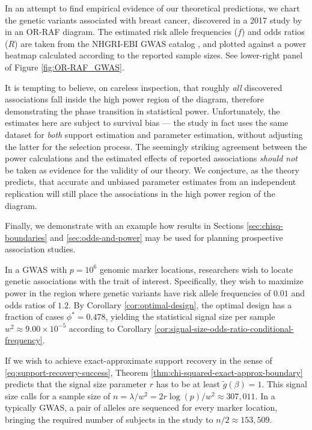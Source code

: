 \begin{remark}
\label{rmk:OR-RAF_false_evidence}
In an attempt to find empirical evidence of our theoretical predictions, we chart the genetic variants associated with breast cancer, discovered in a 2017 study by \citet{michailidou2017association} in an OR-RAF diagram. 
The estimated risk allele frequencies ($f$) and odds ratios ($R$) are taken from the NHGRI-EBI GWAS catalog \cite{macarthur2016new}, and plotted against a power heatmap calculated according to the reported sample sizes. 
See lower-right panel of Figure \ref{fig:OR-RAF_GWAS}.

It is tempting to believe, on careless inspection, that roughly \emph{all} discovered associations fall inside the high power region of the diagram, therefore demonstrating the phase transition in statistical power.
Unfortunately, the estimates here are subject to survival {bias} --- the study in fact uses the {same} dataset for \emph{both} support estimation and parameter estimation, without adjusting the latter for the selection process.
The seemingly striking agreement between the power calculations and the estimated effects of reported associations \emph{should not} be taken as evidence for the validity of our theory.
We conjecture, as the theory predicts, that accurate and unbiased parameter estimates from an independent replication will still place the associations in the high power region of the diagram. 
\end{remark}

Finally, we demonstrate with an example how results in Sections \ref{sec:chisq-boundaries} and \ref{sec:odds-and-power} may be used for planning prospective association studies.

\begin{example}
In a GWAS with $p = 10^6$ genomic marker locations, researchers wish to locate genetic associations with the trait of interest.
Specifically, they wish to maximize power in the region where genetic variants have risk allele frequencies of $0.01$ and odds ratios of $1.2$.
By Corollary \ref{cor:optimal-design}, the optimal design has a fraction of cases $\phi^* = 0.478$, yielding the statistical signal size per sample $w^2\approx9.00\times10^{-5}$ according to Corollary \ref{cor:signal-size-odds-ratio-conditional-frequency}.

If we wish to achieve exact-approximate support recovery in the sense of \eqref{eq:support-recovery-success}, Theorem \ref{thm:chi-squared-exact-approx-boundary} predicts that the signal size parameter $r$ has to be at least $\widetilde{g}(\beta)= 1$.
This signal size calls for a sample size of $n = \lambda / w^2 = 2r\log(p)/w^2 \approx 307,011$.
In a typically GWAS, a pair of alleles are sequenced for every marker location, bringing the required number of subjects in the study to $n/2 \approx 153,509$.
\end{example}


